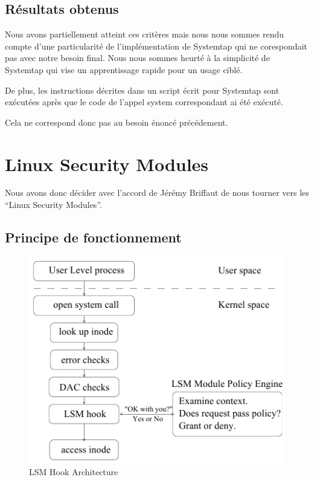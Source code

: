 \documentclass[pdftex,a4paper,titlepage,11pt,openright]{article}
\begin{document}
\subsection{Résultats obtenus}

Nous avons partiellement atteint ces critères mais nous nous sommes rendu compte d'une particularité de l'implémentation de Systemtap qui ne corespondait pas avec notre besoin final. Nous nous sommes heurté à la simplicité de Systemtap qui vise un apprentissage rapide pour un usage ciblé.

De plus, les instructions décrites dans un script écrit pour Systemtap sont exécutées après que le code de l'appel system correspondant ai été exécuté.


Cela ne correspond donc pas au besoin énoncé précédement.


\newpage


\section{Linux Security Modules}

Nous avons donc décider avec l'accord de Jérémy Briffaut de nous tourner vers les ``Linux Security Modules''.

\subsection{Principe de fonctionnement}

\begin{figure}[hb]
	\centering
	\includegraphics[scale=0.45]{lsm1.png}
	\caption{LSM Hook Architecture \cite{LSMINTRO}}
\end{figure}
\end{document}
